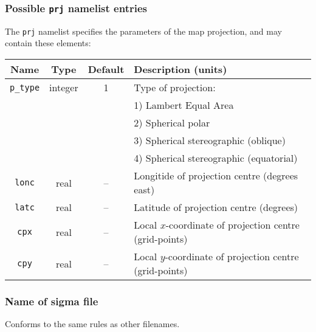 \subsubsection{Possible \texttt{prj} namelist entries}
%
The \texttt{prj} namelist specifies the parameters of the map projection, and
may contain these elements:
%
\begin{center}
\begin{tabular}{|c|c|c|l|}
\hline
Name & Type & Default & Description (units) \\
\hline
\hline
\texttt{p\_type} & integer & 1 & Type of projection: \\
 & & & 1) Lambert Equal Area \\
 & & & 2) Spherical polar \\
 & & & 3) Spherical stereographic (oblique) \\
 & & & 4) Spherical stereographic (equatorial) \\
\hline  
\texttt{lonc} & real & -- & Longitide of projection centre (degrees east) \\
\texttt{latc} & real & -- & Latitude of projection centre (degrees)\\
\texttt{cpx} & real & -- & Local $x$-coordinate of projection centre
(grid-points) \\
\texttt{cpy} & real & -- & Local $y$-coordinate of projection centre
(grid-points) \\
\hline
\end{tabular}
\end{center}
%
\subsubsection{Name of sigma file}
%
Conforms to the same rules as other filenames.
%
